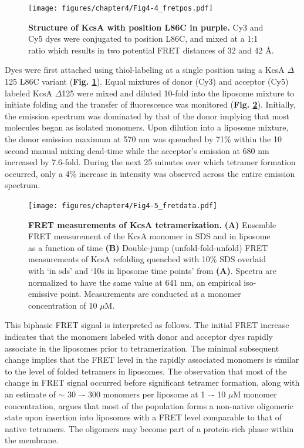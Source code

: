 \begin{figure}[!ht]
\begin{center}
	\texttt{[image: figures/chapter4/Fig4-4\_fretpos.pdf]}
\end{center}
	\caption{\textbf{Structure of KcsA with position L86C in purple.} Cy3 and Cy5 dyes were conjugated to position L86C, and mixed at a 1:1 ratio which results in two potential FRET distances of 32 and 42 Å.}
	\label{fig:ch4_f4}
\end{figure}

Dyes were first attached using thiol-labeling at a single position using a KcsA $\Delta$125 L86C variant (\textbf{Fig. \ref{fig:ch4_f4}}). Equal mixtures of donor (Cy3) and acceptor (Cy5) labeled KcsA $\Delta$125 were mixed and diluted 10-fold into the liposome mixture to initiate folding and the transfer of fluorescence was monitored (\textbf{Fig. \ref{fig:ch4_f5}}). Initially, the emission spectrum was dominated by that of the donor implying that most molecules began as isolated monomers. Upon dilution into a liposome mixture, the donor emission maximum at 570 nm was quenched by 71\% within the 10 second manual mixing dead-time while the acceptor’s emission at 680 nm increased by 7.6-fold. During the next 25 minutes over which tetramer formation occurred, only a 4\% increase in intensity was observed across the entire emission spectrum. 

\begin{figure}[!ht]
\begin{center}
	\texttt{[image: figures/chapter4/Fig4-5\_fretdata.pdf]}
\end{center}
	\caption{\textbf{FRET measurements of KcsA tetramerization.} \textbf{(A)} Ensemble FRET measurement of the KcsA monomer in SDS and in liposome as a function of time \textbf{(B)} Double-jump (unfold-fold-unfold) FRET measurements of KcsA refolding quenched with 10\% SDS overlaid with ‘in sds’ and ‘10s in liposome time points’ from \textbf{(A)}. Spectra are normalized to have the same value at 641 nm, an empirical iso-emissive point. Measurements are conducted at a monomer concentration of 10 $\mu$M.}
	\label{fig:ch4_f5}
\end{figure}

This biphasic FRET signal is interpreted as follows. The initial FRET increase indicates that the monomers labeled with donor and acceptor dyes rapidly associate in the liposomes prior to tetramerization. The minimal subsequent change implies that the FRET level in the rapidly associated monomers is similar to the level of folded tetramers in liposomes. The observation that most of the change in FRET signal occurred before significant tetramer formation, along with an estimate of $\sim$ 30 –- 300 monomers per liposome at 1 –- 10 $\mu$M monomer concentration, argues that most of the population forms a non-native oligomeric state upon insertion into liposomes with a FRET level comparable to that of native tetramers. The oligomers may become part of a protein-rich phase within the membrane.

